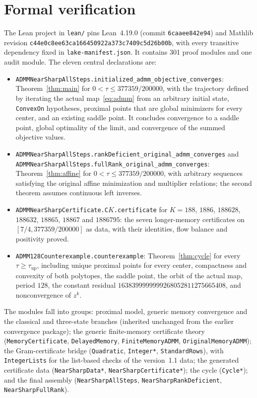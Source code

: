 \documentclass[11pt]{article}
\numberwithin{equation}{section}
\theoremstyle{definition}
\theoremstyle{remark}
\newcommand{\lean}[1]{{\urlstyle{tt}\nolinkurl{#1}}}
\newcommand{\taunew}{377359/200000}
\newcommand{\tauup}{\tau_{\mathrm{up}}}
\begin{document}
\section{Formal verification}\label{sec:formal}
The Lean project in \lean{lean/} pins Lean~4.19.0 (commit \texttt{6caaee842e94}) and Mathlib revision \texttt{c44e0c8ee63ca166450922a373c7409c5d26b00b}, with every transitive dependency fixed in \lean{lake-manifest.json}. It contains 301 proof modules and one audit module. The eleven central declarations are:
{\sloppy
\begin{itemize}[leftmargin=1.5em]
\item \lean{ADMMNearSharpAllSteps.initialized_admm_objective_converges}: Theorem~\ref{thm:main} for $0<\tau\le\taunew$, with the trajectory defined by iterating the actual map~\eqref{eq:admm} from an arbitrary initial state, \texttt{ConvexOn} hypotheses, proximal points that are global minimizers for every center, and an existing saddle point. It concludes convergence to a saddle point, global optimality of the limit, and convergence of the summed objective values.
\item \lean{ADMMNearSharpAllSteps.rankDeficient_original_admm_converges} and \lean{ADMMNearSharpAllSteps.fullRank_original_admm_converges}: Theorem~\ref{thm:affine} for $0<\tau\le\taunew$, with arbitrary sequences satisfying the original affine minimization and multiplier relations; the second theorem assumes continuous left inverses.
\item \lean{ADMMNearSharpCertificate.C}$K$\lean{.certificate} for $K=188$, $1886$, $188628$, $188632$, $18865$, $18867$ and $1886795$: the seven longer-memory certificates on $[7/4,\taunew]$ as data, with their identities, flow balance and positivity proved.
\item \lean{ADMM128Counterexample.counterexample}: Theorem~\ref{thm:cycle} for every $\tau\ge\tauup$, including unique proximal points for every center, compactness and convexity of both polytopes, the saddle point, the orbit of the actual map, period $128$, the constant residual $1638399999999268052811275665408$, and nonconvergence of $z^k$.
\end{itemize}
}
The modules fall into groups: proximal model, generic memory convergence and the classical and three-state branches (inherited unchanged from the earlier convergence package); the generic finite-memory certificate theory (\texttt{MemoryCertificate}, \texttt{DelayedMemory}, \texttt{FiniteMemoryADMM}, \texttt{OriginalMemoryADMM}); the Gram-certificate bridge (\texttt{Quadratic}, \texttt{Integer*}, \texttt{StandardRows}), with \texttt{IntegerLists} for the list-based checks of the version~1.1 data; the generated certificate data (\texttt{NearSharpData*}, \texttt{NearSharpCertificate*}); the cycle (\texttt{Cycle*}); and the final assembly (\texttt{NearSharpAllSteps}, \texttt{NearSharpRankDeficient}, \texttt{NearSharpFullRank}).
\end{document}

